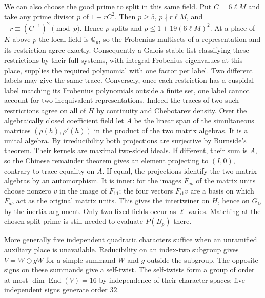 \documentclass[11pt]{amsart}
\theoremstyle{definition}
\theoremstyle{remark}
\begin{document}
We can also choose the good prime to split in this same field.
Put $C=6\ell M$ and take any prime divisor $p$ of $1+rC^2$.
Then $p\ge5$, $p\nmid r\ell M$, and $-r\equiv (C^{-1})^2\pmod p$.
Hence $p$ splits and $p\le1+19(6\ell M)^2$. At a place of $K$
above $p$ the local field is $\mathbb Q_p$, so the Frobenius
multisets of a representation and its restriction agree exactly.
Consequently a Galois-stable list classifying these restrictions
by their full systems, with integral Frobenius eigenvalues at this
place, supplies the required polynomial with one factor per label.
Two different labels may give the same trace. Conversely, once
each restriction has a cuspidal label matching its Frobenius
polynomials outside a finite set, one label cannot account for two
inequivalent representations. Indeed the traces of two such
restrictions agree on all of $H$ by continuity and Chebotarev
density. Over the algebraically closed coefficient field let $A$
be the linear span of the simultaneous matrices
$(\rho(h),\rho'(h))$ in the product of the two matrix algebras.
It is a unital algebra. By irreducibility both projections are
surjective by Burnside's theorem. Their kernels are maximal
two-sided ideals. If different, their sum is $A$, so the Chinese
remainder theorem gives an element projecting to $(I,0)$, contrary
to trace equality on $A$. If equal, the projections identify the
two matrix algebras by an automorphism. It is inner: for the images
$F_{ab}$ of the matrix units choose nonzero $v$ in the image of
$F_{11}$; the four vectors $F_{i1}v$ are a basis on which $F_{ab}$
act as the original matrix units. This gives the intertwiner on
$H$, hence on $G_{\mathbb Q}$ by the inertia argument. Only two
fixed fields occur as $\ell$ varies. Matching at the chosen split
prime is still needed to evaluate $P(B_p)$ there.

More generally five independent quadratic characters suffice
when an unramified auxiliary place is unavailable. Reducibility
on an index-two subgroup gives $V=W\oplus gW$ for a simple
summand $W$ and $g$ outside the subgroup. The opposite signs on
these summands give a self-twist. The self-twists form a group of
order at most $\dim\operatorname{End}(V)=16$ by independence of
their character spaces; five independent signs generate order $32$.
\end{document}
